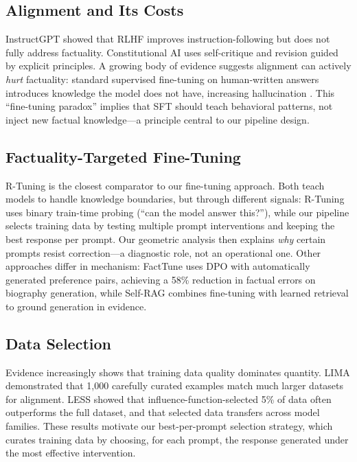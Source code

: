 \subsection{Alignment and Its Costs}

InstructGPT \citep{ouyang2022training} showed that RLHF improves instruction-following but does not fully address factuality.  Constitutional AI \citep{bai2022constitutional} uses self-critique and revision guided by explicit principles.  A growing body of evidence suggests alignment can actively \emph{hurt} factuality: standard supervised fine-tuning on human-written answers introduces knowledge the model does not have, increasing hallucination \citep{gekhman2024does}.  This ``fine-tuning paradox'' implies that SFT should teach behavioral patterns, not inject new factual knowledge---a principle central to our pipeline design.

\subsection{Factuality-Targeted Fine-Tuning}

R-Tuning \citep{zhang2023rtuning} is the closest comparator to our fine-tuning approach.  Both teach models to handle knowledge boundaries, but through different signals: R-Tuning uses binary train-time probing (``can the model answer this?''), while our pipeline selects training data by testing multiple prompt interventions and keeping the best response per prompt.  Our geometric analysis then explains \emph{why} certain prompts resist correction---a diagnostic role, not an operational one.  Other approaches differ in mechanism: FactTune \citep{tian2024finetuning} uses DPO with automatically generated preference pairs, achieving a 58\% reduction in factual errors on biography generation, while Self-RAG \citep{asai2024selfrag} combines fine-tuning with learned retrieval to ground generation in evidence.

\subsection{Data Selection}

Evidence increasingly shows that training data quality dominates quantity.  LIMA \citep{zhou2023lima} demonstrated that 1,000 carefully curated examples match much larger datasets for alignment.  LESS \citep{xia2024less} showed that influence-function-selected 5\% of data often outperforms the full dataset, and that selected data transfers across model families.  These results motivate our best-per-prompt selection strategy, which curates training data by choosing, for each prompt, the response generated under the most effective intervention.

